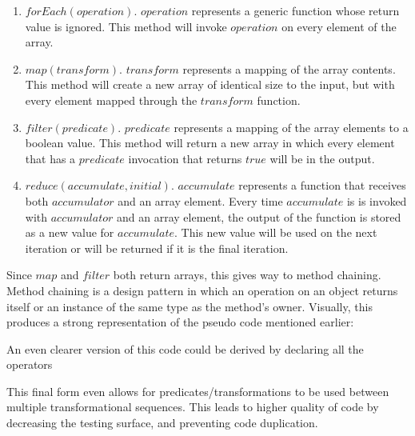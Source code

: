 \documentclass{article}
\begin{document}
  \begin{enumerate}
    \item $forEach(operation)$.  $operation$ represents a generic function whose return value is ignored.  This method will invoke $operation$ on every element of the array.

    \item $map(transform)$.  $transform$ represents a mapping of the array contents.  This method will create a new array of identical size to the input, but with every element mapped through the $transform$ function.

    \item $filter(predicate)$.  $predicate$ represents a mapping of the array elements to a boolean value.  This method will return a new array in which every element that has a $predicate$ invocation that returns $true$ will be in the output.

    \item $reduce(accumulate, initial)$.  $accumulate$ represents a function that receives both $accumulator$ and an array element. Every time $accumulate$ is is invoked with $accumulator$ and an array element, the output of the function is stored as a new value for $accumulate$.  This new value will be used on the next iteration or will be returned if it is the final iteration.

  \end{enumerate}

  Since $map$ and $filter$ both return arrays, this gives way to method chaining. Method chaining is a design pattern in which an operation on an object returns itself or an instance of the same type as the method's owner. Visually, this produces a strong representation of the pseudo code mentioned earlier:
  
  \begin{minipage}{\linewidth}
  
  \end{minipage} 

  An even clearer version of this code could be derived by declaring all the operators

  \begin{minipage}{\linewidth}
  
  \end{minipage}

  This final form even allows for predicates/transformations to be used between multiple transformational sequences.  This leads to higher quality of code by decreasing the testing surface, and preventing code duplication. 
\end{document}

